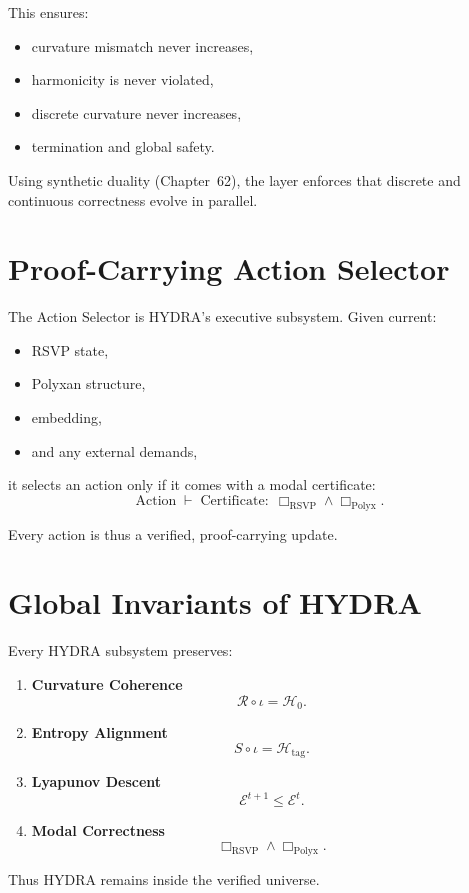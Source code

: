 This ensures:
\begin{itemize}
\item curvature mismatch never increases,
\item harmonicity is never violated,
\item discrete curvature never increases,
\item termination and global safety.
\end{itemize}

Using synthetic duality (Chapter~62), the layer enforces that discrete and continuous correctness evolve in parallel.

\section{Proof-Carrying Action Selector}

The Action Selector is HYDRA’s executive subsystem.  
Given current:
\begin{itemize}
\item RSVP state,
\item Polyxan structure,
\item embedding,
\item and any external demands,
\end{itemize}
it selects an action only if it comes with a modal certificate:
\[
\text{Action} \;\vdash\; \text{Certificate}:\;
\Box_{\mathrm{RSVP}} \wedge \Box_{\mathrm{Polyx}}.
\]

Every action is thus a verified, proof-carrying update.

\section{Global Invariants of HYDRA}

\begin{theorem}
Every HYDRA subsystem preserves:
\begin{enumerate}
\item \textbf{Curvature Coherence}
\[
\mathcal{R} \circ \iota = \mathcal{H}_0.
\]

\item \textbf{Entropy Alignment}
\[
S \circ \iota = \mathcal{H}_{\mathrm{tag}}.
\]

\item \textbf{Lyapunov Descent}
\[
\mathcal{E}^{t+1} \le \mathcal{E}^{t}.
\]

\item \textbf{Modal Correctness}
\[
\Box_{\mathrm{RSVP}} \wedge \Box_{\mathrm{Polyx}}.
\]
\end{enumerate}
Thus HYDRA remains inside the verified universe.
\end{theorem}

